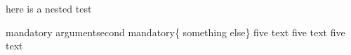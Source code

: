 here is a nested test
\begin{five}[optional]{mandatory argument}{second mandatory}\{ something else\}
	five text
	five text
	five text
\end{five}
